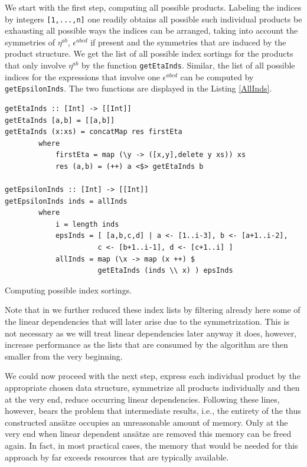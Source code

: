 \documentclass[a4paper,12pt, DIV=14, BCOR=5mm, twoside, headsepline, numbers=noenddot]{scrbook}
\begin{document}
We start with the first step, computing all possible products. Labeling the indices by integers \texttt{[1,...,n]} one readily obtains all possible such individual products be exhausting all possible ways the indices can be arranged, taking into account the symmetries of $\eta^{ab}$, $\epsilon^{abcd}$ if present and the symmetries that are induced by the product structure. We get the list of all possible index sortings for the products that only involve $\eta^{ab}$ by the function \texttt{getEtaInds}.
Similar, the list of all possible indices for the expressions that involve one $\epsilon^{abcd}$ can be computed by \texttt{getEpsilonInds}. The two functions are displayed in the Listing \ref{AllInds}.
\begin{listing}[hbt!]
\begin{verbatim}
getEtaInds :: [Int] -> [[Int]]
getEtaInds [a,b] = [[a,b]]
getEtaInds (x:xs) = concatMap res firstEta
        where
            firstEta = map (\y -> ([x,y],delete y xs)) xs
            res (a,b) = (++) a <$> getEtaInds b 

getEpsilonInds :: [Int] -> [[Int]]
getEpsilonInds inds = allInds
        where
            i = length inds 
            epsInds = [ [a,b,c,d] | a <- [1..i-3], b <- [a+1..i-2],
                      c <- [b+1..i-1], d <- [c+1..i] ] 
            allInds = map (\x -> map (x ++) $
                      getEtaInds (inds \\ x) ) epsInds 
\end{verbatim} 
\caption{Computing possible index sortings.}\label{AllInds}
\end{listing}

Note that in \cite{sparse-tensor} we further reduced these index lists by filtering already here some of the linear dependencies that will later arise due to the symmetrization. This is not necessary as we will treat linear dependencies later anyway it does, however, increase performance as the lists that are consumed by the algorithm are then smaller from the very beginning.  

We could now proceed with the next step, express each individual product by the appropriate chosen data structure, symmetrize all products individually and then at the very end, reduce occurring linear dependencies. Following these lines, however, bears the problem that intermediate results, i.e., the entirety of the thus constructed ansätze occupies an unreasonable amount of memory. Only at the very end when linear dependent ansätze are removed this memory can be freed again. In fact, in most practical cases, the memory that would be needed for this approach by far exceeds resources that are typically available.
\end{document}
